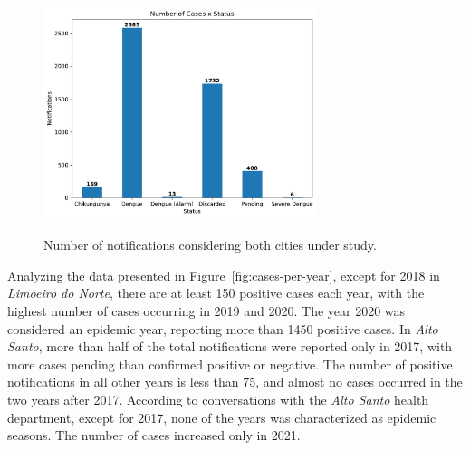 \begin{figure}[h!]
    \centering
    \includegraphics[width=8cm, height=7cm]{images/cases-per-status.pdf}
    \caption{Number of notifications considering both cities under study.}\label{fig:cases-per-status}
\end{figure}

Analyzing the data presented in Figure~\ref{fig:cases-per-year}, except for 2018 in \textit{Limoeiro do Norte}, there are at least 150 positive cases each year, with the highest number of cases occurring in 2019 and 2020. The year 2020 was considered an epidemic year, reporting more than 1450 positive cases. In \textit{Alto Santo}, more than half of the total notifications were reported only in 2017, with more cases pending than confirmed positive or negative. The number of positive notifications in all other years is less than 75, and almost no cases occurred in the two years after 2017. According to conversations with the \textit{Alto Santo} health department, except for 2017, none of the years was characterized as epidemic seasons. The number of cases increased only in 2021.
    
